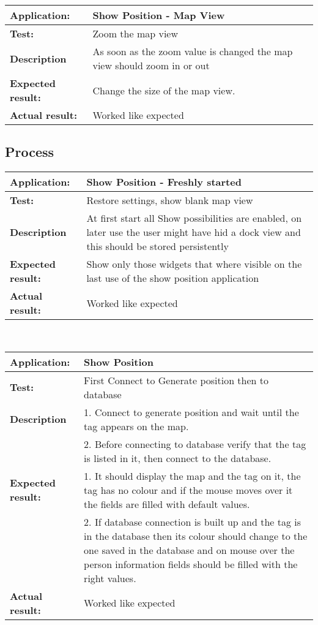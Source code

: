    \begin{tabular}{|p{3.5cm}|p{10.5cm}|}
    \hline
     \textbf{Application:}	& Show Position - Map View\\
    \hline
     \textbf{Test:}		& Zoom the map view\\
    \hline
     \textbf{Description}	& As soon as the zoom value is changed the map view should zoom in or out\\
    \hline
     \textbf{Expected result:}	& Change the size of the map view.\\
    \hline
     \textbf{Actual result:}	& Worked like expected\\
    \hline
   \end{tabular}

  \subsection{Process}
   \begin{tabular}{|p{3.5cm}|p{10.5cm}|}
    \hline
     \textbf{Application:}	& Show Position - Freshly started\\
    \hline
     \textbf{Test:}		& Restore settings, show blank map view\\
    \hline
     \textbf{Description}	& At first start all Show possibilities are enabled, on later use the user might have hid a dock view and this should be stored persistently\\
    \hline
     \textbf{Expected result:}	& Show only those widgets that where visible on the last use of the show position application\\
    \hline
     \textbf{Actual result:}	& Worked like expected\\
    \hline
   \end{tabular}\\
   \begin{tabular}{|p{3.5cm}|p{10.5cm}|}
    \hline
     \textbf{Application:}	& Show Position\\
    \hline
     \textbf{Test:}		& First Connect to Generate position then to database\\
    \hline
     \textbf{Description}	& 1. Connect to generate position and wait until the tag appears on the map.\\
     				& 2. Before connecting to database verify that the tag is listed in it, then connect to the database.\\
    \hline
     \textbf{Expected result:}	& 1. It should display the map and the tag on it, the tag has no colour and if the mouse moves over it the fields are filled with default values.\\
     				& 2. If database connection is built up and the tag is in the database then its colour should change to the one saved in the database and on mouse over the person information fields should be filled with the right values.\\
    \hline
     \textbf{Actual result:}	& Worked like expected\\
    \hline
   \end{tabular}\\

